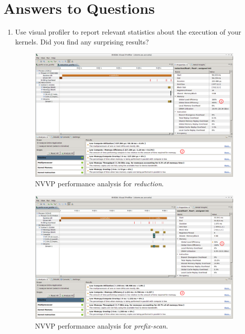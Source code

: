 \documentclass[a4paper,10pt]{scrartcl}
\begin{document}
\section{Answers to Questions}
\begin{enumerate}
 \item Use visual profiler to report relevant statistics about the execution of your kernels.  Did you find any surprising results?
 
 \begin{figure}
  \centering
  \includegraphics[width=\textwidth]{./NVVP_Reduction.png}
  \caption{NVVP performance analysis for \textit{reduction}.}\label{fig:NVVP_Reduction}
 \end{figure}

 \begin{figure}
  \centering
  \includegraphics[width=\textwidth]{./NVVP_Prefix-scan.png}
  \caption{NVVP performance analysis for \textit{prefix-scan}.}\label{fig:NVVP_Prefix-scan}
 \end{figure}


\end{enumerate}
\end{document}
